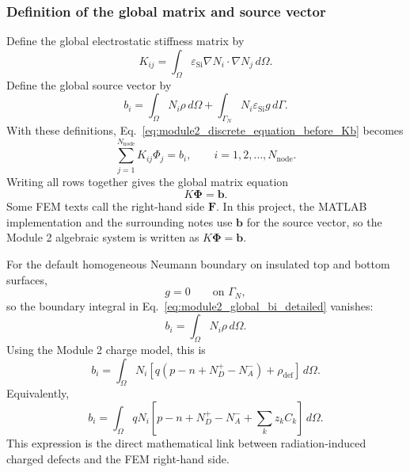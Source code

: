 \documentclass[11pt]{article}
\begin{document}
\subsubsection{Definition of the global matrix and source vector}

Define the global electrostatic stiffness matrix by
\begin{equation}
\boxed{
K_{ij}
= \int_{\Omega} \varepsilon_{\mathrm{Si}} \nabla N_i \cdot \nabla N_j \, d\Omega .
}
\label{eq:module2_global_Kij_detailed}
\end{equation}
Define the global source vector by
\begin{equation}
\boxed{
b_i
= \int_{\Omega} N_i \rho \, d\Omega
+ \int_{\Gamma_N} N_i \varepsilon_{\mathrm{Si}} g \, d\Gamma .
}
\label{eq:module2_global_bi_detailed}
\end{equation}
With these definitions, Eq.~\eqref{eq:module2_discrete_equation_before_Kb} becomes
\begin{equation}
\boxed{
\sum_{j=1}^{N_{\mathrm{node}}} K_{ij}\Phi_j = b_i,
\qquad i=1,2,\ldots,N_{\mathrm{node}} .
}
\label{eq:module2_discrete_row_equation}
\end{equation}
Writing all rows together gives the global matrix equation
\begin{equation}
\boxed{
K\bm{\Phi}=\bm{b}.
}
\label{eq:module2_global_matrix_equation_detailed}
\end{equation}
Some FEM texts call the right-hand side $\bm{F}$. In this project, the MATLAB implementation and the surrounding notes use $\bm{b}$ for the source vector, so the Module 2 algebraic system is written as $K\bm{\Phi}=\bm{b}$.

For the default homogeneous Neumann boundary on insulated top and bottom surfaces,
\begin{equation}
g=0 \qquad \text{on } \Gamma_N,
\end{equation}
so the boundary integral in Eq.~\eqref{eq:module2_global_bi_detailed} vanishes:
\begin{equation}
\boxed{
b_i
= \int_{\Omega} N_i \rho \, d\Omega .
}
\label{eq:module2_bi_insulating_boundary}
\end{equation}
Using the Module 2 charge model, this is
\begin{equation}
\boxed{
b_i
= \int_{\Omega} N_i
\left[q(p-n+N_D^+-N_A^-)+\rho_{\mathrm{def}}\right]
\, d\Omega .
}
\label{eq:module2_bi_charge_model}
\end{equation}
Equivalently,
\begin{equation}
\boxed{
b_i
= \int_{\Omega} q N_i
\left[p-n+N_D^+-N_A^-+\sum_k z_k C_k\right]
\, d\Omega .
}
\label{eq:module2_bi_defect_species}
\end{equation}
This expression is the direct mathematical link between radiation-induced charged defects and the FEM right-hand side.
\end{document}
